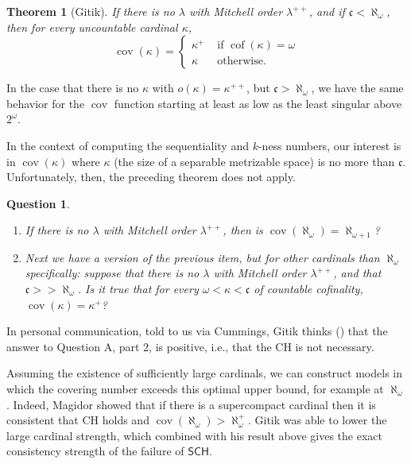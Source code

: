 \documentclass{article}
\newtheorem{thm}{Theorem}[section]
\newtheorem{qu}{Question}
\DeclareMathOperator{\cof}{cof}
\begin{document}
\begin{thm}[Gitik]\label{thm:boringcov}
    If there is no $\lambda$ with Mitchell order $\lambda^{++}$, and if $\mathfrak{c}<\aleph_\omega$, then for every uncountable cardinal $\kappa$,
    \[ \mathop{cov}(\kappa) = 
    \begin{cases}
        \kappa^+ & \text{ if }\cof(\kappa)=\omega \\
        \kappa & \text{ otherwise.}
    \end{cases}\]
\end{thm}


In the case that there is no $\kappa$ with $o(\kappa)=\kappa^{++}$, but $\mathfrak{c}>\aleph_\omega$, we have the same behavior for the $\mathop{cov}$ function starting at least as low as the least singular above $2^\omega$.





In the context of computing the sequentiality and $k$-ness numbers, our interest is in $\mathop{cov}(\kappa)$ where $\kappa$ (the size of a separable metrizable space) is no more than $\mathfrak{c}$. 
Unfortunately, then, the preceding theorem does not apply. 
\begin{qu}\label{qu:large_card}\hfill
\begin{enumerate}[noitemsep,topsep=1pt]
\item If there is no $\lambda$ with Mitchell order $\lambda^{++}$, then is $\mathop{cov}(\aleph_\omega)=\aleph_{\omega+1}$? 
\item Next we have a version of the previous item, but for other cardinals than $\aleph_\omega$ specifically: suppose that there is no $\lambda$ with Mitchell order $\lambda^{++}$, and that $\mathfrak{c}>>\aleph_{\omega}$. Is it true that for every $\omega<\kappa<\mathfrak{c}$ of countable cofinality, $\mathop{cov}(\kappa)=\kappa^+$? 
\end{enumerate}
\end{qu}

In personal communication, told to us via Cummings, Gitik thinks (\cite{Gitik:personal}) that the answer to Question A, part 2, is positive, i.e., that the \textsc{CH} is not necessary.

Assuming the existence of sufficiently large cardinals, we can construct models in which the covering number exceeds this optimal upper bound, for example at $\aleph_\omega$.
Indeed, Magidor \cite{Magidor} showed that if there is a supercompact cardinal then it is consistent that \textsc{CH} holds and $\mathop{cov}(\aleph_\omega)>\aleph_{\omega}^+$. 
Gitik 
\cite{Gitik:NegSCH} was able to lower the large cardinal strength, which combined with his result above 
gives the exact consistency strength of the failure of $\mathsf{SCH}$.
\end{document}
